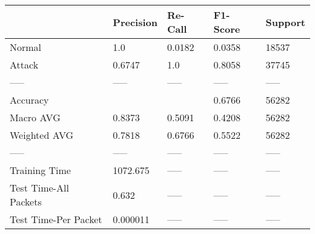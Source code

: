 \begin{tabular}{lllll}
\toprule
{} & Precision & Re-Call & F1-Score & Support \\
\midrule
Normal                &       1.0 &  0.0182 &   0.0358 &   18537 \\
Attack                &    0.6747 &     1.0 &   0.8058 &   37745 \\
-----                 &     ----- &   ----- &    ----- &   ----- \\
Accuracy              &           &         &   0.6766 &   56282 \\
Macro AVG             &    0.8373 &  0.5091 &   0.4208 &   56282 \\
Weighted AVG          &    0.7818 &  0.6766 &   0.5522 &   56282 \\
-----                 &     ----- &   ----- &    ----- &   ----- \\
Training Time         &  1072.675 &   ----- &    ----- &   ----- \\
Test Time-All Packets &     0.632 &   ----- &    ----- &   ----- \\
Test Time-Per Packet  &  0.000011 &   ----- &    ----- &   ----- \\
\bottomrule
\end{tabular}
